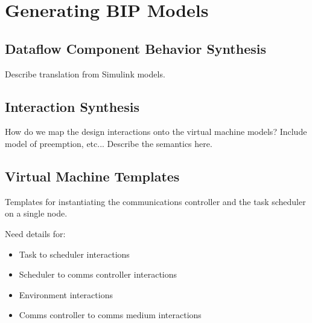 
\section{Generating BIP Models}

\subsection{Dataflow Component Behavior Synthesis}

Describe translation from Simulink models.

\subsection{Interaction Synthesis}

How do we map the design interactions onto the virtual machine models?  Include model of preemption, etc...  Describe the semantics here.

\subsection{Virtual Machine Templates}

Templates for instantiating the communications controller and the task scheduler on a single node.  

Need details for: 

\begin{itemize}
\item Task to scheduler interactions
\item Scheduler to comms controller interactions
\item Environment interactions
\item Comms controller to comms medium interactions
\end{itemize}
